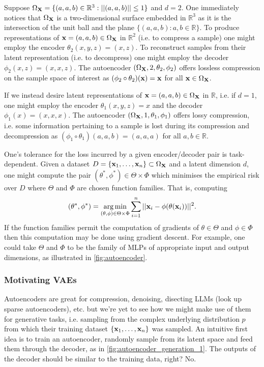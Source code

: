\documentclass[11pt]{article}
\begin{document}
\begin{tcolorbox}[title={\centering\textbf{Autoencoder example}}, colback=myLightBlue, colbacktitle=myDarkBlue, colframe=myDarkBlue, coltitle=white]
    Suppose $\Omega_{\mathbf{X}}=\{(a,a,b)\in\mathbb{R}^3:||(a,a,b)||\leq1\}$ and $d=2$. One immediately notices that $\Omega_{\mathbf{X}}$ is a two-dimensional surface embedded in $\mathbb{R}^3$ as it is the intersection of the unit ball and the plane $\{(a,a,b):a,b\in\mathbb{R}\}$. To produce representations of $\mathbf{x}=(a,a,b)\in\Omega_{\mathbf{X}}$ in $\mathbb{R}^2$ (i.e. to compress a sample) one might employ the encoder $\theta_2(x,y,z)=(x,z)$. To reconstruct samples from their latent representation (i.e. to decompress) one might employ the decoder $\phi_2(x,z)=(x,x,z)$. The autoencoder $(\Omega_{\mathbf{X}},2,\theta_2,\phi_2)$ offers lossless compression on the sample space of interest as $(\phi_2\circ\theta_2)(\mathbf{x})=\mathbf{x}$ for all $\mathbf{x}\in\Omega_{\mathbf{X}}$.
    
    \hspace{15pt} If we instead desire latent representations of $\mathbf{x}=(a,a,b)\in\Omega_{\mathbf{X}}$ in $\mathbb{R}$, i.e. if $d=1$, one might employ the encoder $\theta_1(x,y,z)=x$ and the decoder $\phi_1(x)=(x,x,x)$. The autoencoder $(\Omega_{\mathbf{X}},1,\theta_1,\phi_1)$ offers lossy compression, i.e. some information pertaining to a sample is lost during its compression and decompression as $(\phi_1\circ\theta_1)(a,a,b)=(a,a,a)$ for all $a,b\in\mathbb{R}$.
\end{tcolorbox}

One's tolerance for the loss incurred by a given encoder/decoder pair is task-dependent. Given a dataset $D=\{\mathbf{x}_1,\dots,\mathbf{x}_n\}\subset\Omega_{\mathbf{X}}$ and a latent dimension $d$, one might compute the pair $(\theta^*,\phi^*)\in\Theta\times\Phi$ which minimises the empirical risk over $D$ where $\Theta$ and $\Phi$ are chosen function families. That is, computing
$$
(\theta^*,\phi^*)
=
\operatorname*{arg\,min}_{(\theta,\phi)\in\Theta\times\Phi}
\sum_{i=1}^n||\mathbf{x}_i-\phi(\theta(\mathbf{x}_i))||^2.
$$
If the function families permit the computation of gradients of $\theta\in\Theta$ and $\phi\in\Phi$ then this computation may be done using gradient descent. For example, one could take $\Theta$ and $\Phi$ to be the family of MLPs of appropriate input and output dimensions, as illustrated in \autoref{fig:autoencoder}.

\subsubsection{Motivating VAEs}
Autoencoders are great for compression, denoising, disecting LLMs (look up sparse autoencoders), etc. but we're yet to see how we might make use of them for generative tasks, i.e. sampling from the complex underlying distribution $p$ from which their training dataset $\{\mathbf{x}_1,\dots,\mathbf{x}_n\}$ was sampled. An intuitive first idea is to train an autoencoder, randomly sample from its latent space and feed them through the decoder, as in \autoref{fig:autoencoder_generation_1}. The outputs of the decoder should be similar to the training data, right? No.
\end{document}

